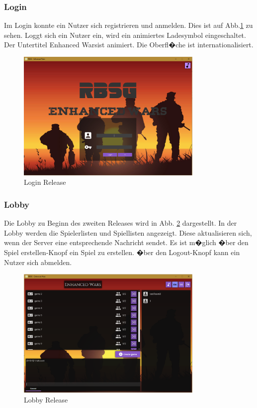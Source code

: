\documentclass[12pt, titlepage]{scrartcl}
\newcommand{\RN}[1]{%
	\textup{\uppercase\expandafter{\romannumeral#1}}%
}
\begin{document}
		\subsubsection{Login}
			Im Login konnte ein Nutzer sich registrieren und anmelden. Dies ist auf Abb.\ref{Login_Release_One} zu sehen. Loggt sich ein Nutzer ein, wird ein animiertes Ladesymbol eingeschaltet. Der Untertitel \glqq Enhanced Wars\grqq ist animiert. Die Oberfl�che ist internationalisiert.
			\begin{figure}[H] 
				\centering
				\includegraphics[width=0.8\textwidth]{Login_Release_One.PNG}
				\caption{Login Release \RN{1}}
				\label{Login_Release_One}
			\end{figure}
		\subsubsection{Lobby}
		Die Lobby zu Beginn des zweiten Releases wird in Abb. \ref{Lobby_Release_One} dargestellt. In der Lobby werden die Spielerlisten und Spiellisten angezeigt. Diese aktualisieren sich, wenn der Server eine entsprechende Nachricht sendet. Es ist m�glich �ber den \glqq Spiel erstellen\grqq-Knopf ein Spiel zu erstellen. �ber den \glqq Logout\grqq-Knopf kann ein Nutzer sich abmelden.
		\begin{figure}[H] 
			\centering
			\includegraphics[width=0.8\textwidth]{Lobby_Release_One.PNG}
			\caption{Lobby Release \RN{1}}
			\label{Lobby_Release_One}
		\end{figure}
\end{document}
